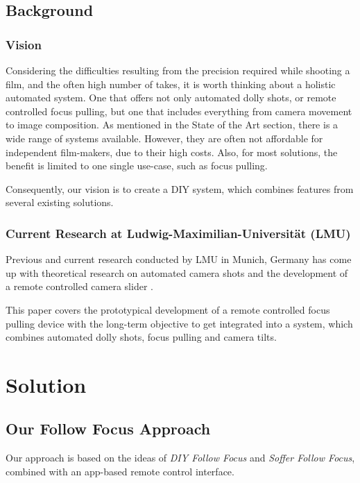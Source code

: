 \documentclass{sigchi}
\begin{document}
\subsection{Background}

\subsubsection{Vision}

Considering the difficulties resulting from the precision required while shooting a film, and the often high number of takes, it is worth thinking about a holistic automated system. One that offers not only automated dolly shots, or remote controlled focus pulling, but one that includes everything from camera movement to image composition. As mentioned in the State of the Art section, there is a wide range of systems available. However, they are often not affordable for independent film-makers, due to their high costs. Also, for most solutions, the benefit is limited to one single use-case, such as focus pulling. 

Consequently, our vision is to create a DIY system, which combines features from several existing solutions.    


\subsubsection{Current Research at Ludwig-Maximilian-Universit\"at (LMU)}

Previous and current research conducted by LMU in Munich, Germany has come up with theoretical research on automated camera shots \cite{pburgdorf} and the development of a remote controlled camera slider \cite{pmoerwald}. 

This paper covers the prototypical development of a remote controlled focus pulling device with the long-term objective to get integrated into a system, which combines automated dolly shots, focus pulling and camera tilts.

\section{Solution}

\subsection{Our Follow Focus Approach}
Our approach is based on the ideas of \textit{DIY Follow Focus} \cite{diyff} and \textit{Soffer Follow Focus}, combined with an app-based remote control interface.
\end{document}
